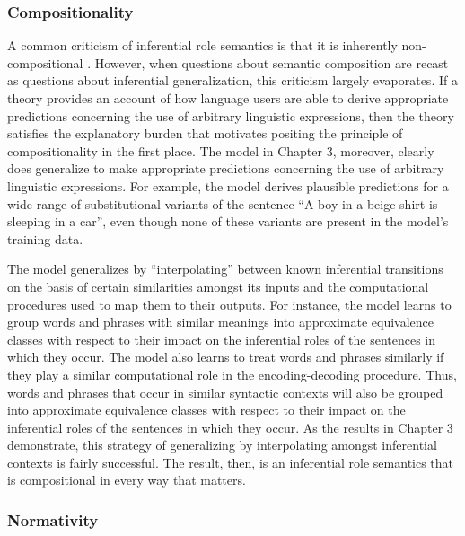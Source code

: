 \subsubsection{Compositionality}

A common criticism of inferential role semantics is that it is inherently non-compositional \citep{FodorLepore:1991}. However, when questions about semantic composition are recast as questions about inferential generalization, this criticism largely evaporates. If a theory provides an account of how language users are able to derive appropriate predictions concerning the use of arbitrary linguistic expressions, then the theory satisfies the explanatory burden that motivates positing the principle of compositionality in the first place. The model in Chapter 3, moreover, clearly does generalize to make appropriate predictions concerning the use of arbitrary linguistic expressions. For example, the model derives plausible predictions for a wide range of substitutional variants of the sentence ``A boy in a beige shirt is sleeping in a car'', even though none of these variants are present in the model's training data. 

The model generalizes by ``interpolating'' between known inferential transitions on the basis of certain similarities amongst its inputs and the computational procedures used to map them to their outputs. For instance, the model learns to group words and phrases with similar meanings into approximate equivalence classes with respect to their impact on the inferential roles of the sentences in which they occur. The model also learns to treat words and phrases similarly if they play a similar computational role in the encoding-decoding procedure. Thus, words and phrases that occur in similar syntactic contexts will also be grouped into approximate equivalence classes with respect to their impact on the inferential roles of the sentences in which they occur. As the results in Chapter 3 demonstrate, this strategy of generalizing by interpolating amongst inferential contexts is fairly successful. The result, then, is an inferential role semantics that is compositional in every way that matters. 

\subsubsection{Normativity}

